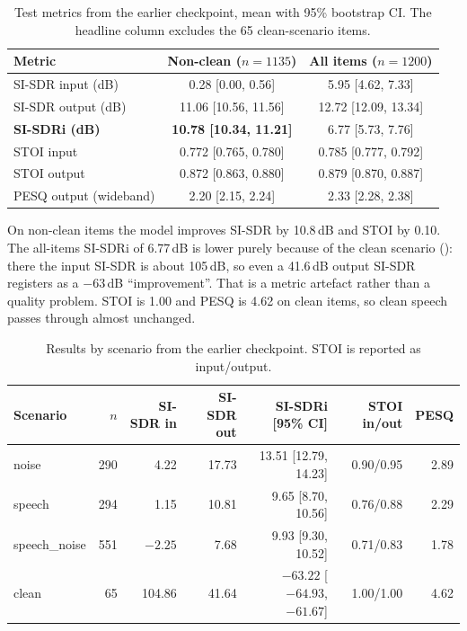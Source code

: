 \documentclass[11pt,a4paper]{article}
\newcommand{\sisdr}{SI-SDR}
\newcommand{\sisdri}{SI-SDRi}
\begin{document}
\begin{table}[htbp]
\centering\small
\caption{Test metrics from the earlier checkpoint, mean with 95\% bootstrap CI. The headline
column excludes the 65 clean-scenario items.}
\label{tab:test}
\begin{tabular}{@{}lcc@{}}
\toprule
Metric & Non-clean ($n{=}1135$) & All items ($n{=}1200$)\\
\midrule
\sisdr{} input (dB) & 0.28 [0.00, 0.56] & 5.95 [4.62, 7.33]\\
\sisdr{} output (dB) & 11.06 [10.56, 11.56] & 12.72 [12.09, 13.34]\\
\textbf{\sisdri{} (dB)} & \textbf{10.78 [10.34, 11.21]} & 6.77 [5.73, 7.76]\\
STOI input & 0.772 [0.765, 0.780] & 0.785 [0.777, 0.792]\\
STOI output & 0.872 [0.863, 0.880] & 0.879 [0.870, 0.887]\\
PESQ output (wideband) & 2.20 [2.15, 2.24] & 2.33 [2.28, 2.38]\\
\bottomrule
\end{tabular}
\end{table}

On non-clean items the model improves \sisdr{} by 10.8\,dB and STOI by 0.10. The all-items
\sisdri{} of 6.77\,dB is lower purely because of the clean scenario (): there
the input \sisdr{} is about 105\,dB, so even a 41.6\,dB output \sisdr{} registers as a $-63$\,dB
``improvement''. That is a metric artefact rather than a quality problem. STOI is 1.00 and PESQ is
4.62 on clean items, so clean speech passes through almost unchanged.

\begin{table}[htbp]
\centering\small
\caption{Results by scenario from the earlier checkpoint. STOI is reported as input/output.}
\label{tab:scenario}
\begin{tabular}{@{}lrrrrrr@{}}
\toprule
Scenario & $n$ & \sisdr{} in & \sisdr{} out & \sisdri{} [95\% CI] & STOI in/out & PESQ\\
\midrule
noise & 290 & 4.22 & 17.73 & 13.51 [12.79, 14.23] & 0.90/0.95 & 2.89\\
speech & 294 & 1.15 & 10.81 & 9.65 [8.70, 10.56] & 0.76/0.88 & 2.29\\
speech\_noise & 551 & $-2.25$ & 7.68 & 9.93 [9.30, 10.52] & 0.71/0.83 & 1.78\\
clean & 65 & 104.86 & 41.64 & $-63.22$ [$-64.93$, $-61.67$] & 1.00/1.00 & 4.62\\
\bottomrule
\end{tabular}
\end{table}
\end{document}
